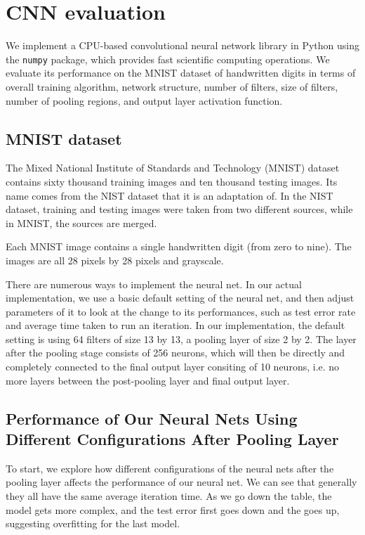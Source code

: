 \documentclass[10pt,twocolumn]{article}
\begin{document}
\section{CNN evaluation} \label{sec:evalcnn}

We implement a CPU-based convolutional neural network library \cite{git:cnn} in Python using the \texttt{numpy} package, which provides fast scientific computing operations. We evaluate its performance on the MNIST dataset of handwritten digits in terms of overall training algorithm, network structure, number of filters, size of filters, number of pooling regions, and output layer activation function.

\subsection{MNIST dataset}

The Mixed National Institute of Standards and Technology (MNIST) dataset contains sixty thousand training images and ten thousand testing images. Its name comes from the NIST dataset that it is an adaptation of. In the NIST dataset, training and testing images were taken from two different sources, while in MNIST, the sources are merged.

Each MNIST image contains a single handwritten digit (from zero to nine). The images are all 28 pixels by 28 pixels and grayscale.

There are numerous ways to implement the neural net. In our actual implementation, we use a basic default setting of the neural net, and then adjust parameters of it to look at the change to its performances, such as test error rate and average time taken to run an iteration. In our implementation, the default setting is using 64 filters of size 13 by 13, a pooling layer of size 2 by 2. The layer after the pooling stage consists of 256 neurons, which will then be directly and completely connected to the final output layer consiting of 10 neurons, i.e. no more layers between the post-pooling layer and final output layer.

\subsection{Performance of Our Neural Nets Using Different Configurations After Pooling Layer}

To start, we explore how different configurations of the neural nets after the pooling layer affects the performance of our neural net. We can see that generally they all have the same average iteration time. As we go down the table, the model gets more complex, and the test error first goes down and the goes up, suggesting overfitting for the last model.
\end{document}
